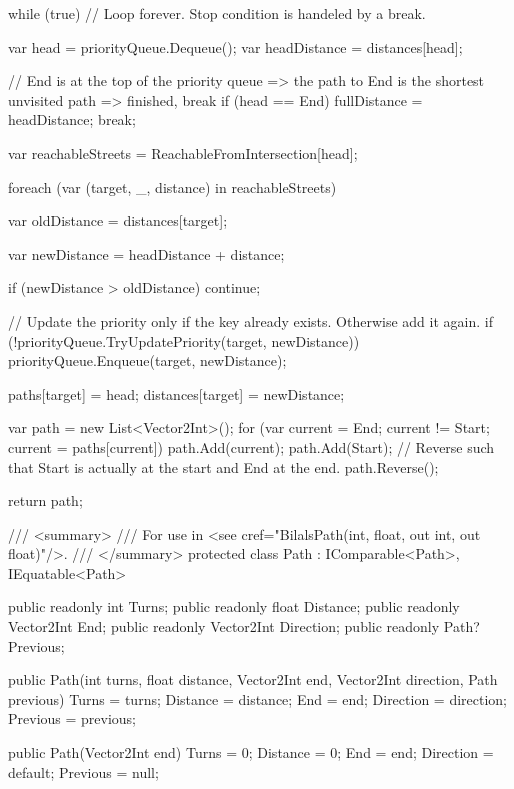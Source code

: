 \documentclass{article}
\begin{document}
\begin{lstcs}[]
{{        while (true) // Loop forever. Stop condition is handeled by a break.
        {
            var head = priorityQueue.Dequeue();
            var headDistance = distances[head];

            // End is at the top of the priority queue => the path to End is the shortest unvisited path => finished, break
            if (head == End)
            {
                fullDistance = headDistance;
                break;
            }

            var reachableStreets = ReachableFromIntersection[head];

            foreach (var (target, _, distance) in reachableStreets)
            {
                var oldDistance = distances[target];

                var newDistance = headDistance + distance;

                if (newDistance > oldDistance) continue;

                // Update the priority only if the key already exists. Otherwise add it again.
                if (!priorityQueue.TryUpdatePriority(target, newDistance)) priorityQueue.Enqueue(target, newDistance);

                paths[target] = head;
                distances[target] = newDistance;
            }
        }

        var path = new List<Vector2Int>();
        for (var current = End; current != Start; current = paths[current]) path.Add(current);
        path.Add(Start);
        // Reverse such that Start is actually at the start and End at the end.
        path.Reverse();

        return path;
    }

    /// <summary>
    /// For use in <see cref="BilalsPath(int, float, out int, out float)"/>.
    /// </summary>
    protected class Path : IComparable<Path>, IEquatable<Path>
    {
        public readonly int Turns;
        public readonly float Distance;
        public readonly Vector2Int End;
        public readonly Vector2Int Direction;
        public readonly Path? Previous;

        public Path(int turns, float distance, Vector2Int end, Vector2Int direction, Path previous)
        {
            Turns = turns;
            Distance = distance;
            End = end;
            Direction = direction;
            Previous = previous;
        }

        public Path(Vector2Int end)
        {
            Turns = 0;
            Distance = 0;
            End = end;
            Direction = default;
            Previous = null;
        }

}}
\end{lstcs}
\end{document}
